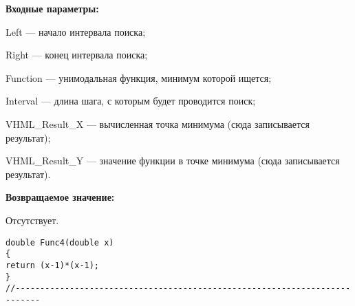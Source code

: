 \textbf{Входные параметры:}

 Left --- начало интервала поиска;
 
Right --- конец интервала поиска;
 
Function --- унимодальная функция, минимум которой ищется;
 
Interval --- длина шага, с которым будет проводится поиск;
 
VHML\_Result\_X --- вычисленная точка минимума (сюда записывается результат);
 
VHML\_Result\_Y --- значение функции в точке минимума (сюда записывается результат).

\textbf{Возвращаемое значение:}
 
 Отсутствует.

\begin{lstlisting}[caption=Оптимизируемая функция]
double Func4(double x)
{
return (x-1)*(x-1);
}
//---------------------------------------------------------------------------
\end{lstlisting}